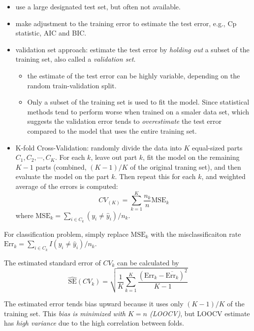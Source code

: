 \documentclass[
  letterpaper,
  DIV=11,
  numbers=noendperiod]{scrreprt}
\providecommand{\tightlist}{%
  \setlength{\itemsep}{0pt}\setlength{\parskip}{0pt}}\usepackage{longtable,booktabs,array}
\begin{document}
\begin{itemize}
\tightlist
\item
  use a large designated test set, but often not available.
\item
  make adjustment to the training error to estimate the test error,
  e.g., Cp statistic, AIC and BIC.
\item
  validation set approach: estimate the test error by \emph{holding out}
  a subset of the training set, also called a \emph{validation set}.

  \begin{itemize}
  \tightlist
  \item
    the estimate of the test error can be highly variable, depending on
    the random train-validation split.
  \item
    Only a subset of the training set is used to fit the model. Since
    statistical methods tend to perform worse when trained on a smaler
    data set, which suggests the validation error tends to
    \emph{overestimate} the test error compared to the model that uses
    the entire training set.
  \end{itemize}
\item
  K-fold Cross-Validation: randomly divide the data into \(K\)
  equal-sized parts \(C_1, C_2, \cdots, C_K\). For each \(k\), leave out
  part \(k\), fit the model on the remaining \(K-1\) parts (combined,
  \((K-1)/K\) of the original traning set), and then evaluate the model
  on the part \(k\). Then repeat this for each \(k\), and weighted
  average of the errors is computed: \[
  CV_{(K)} = \sum_{k=1}^K \frac{n_k}{n}\text{MSE}_k
  \] where \(\text{MSE}_k=\sum_{i\in C_k}(y_i\ne \hat{y}_i)/n_k\).
\end{itemize}

For classification problem, simply replace \(\text{MSE}_k\) with the
misclassificaiton rate
\(\text{Err}_k =\sum_{i\in C_k}I(y_i\ne \hat{y}_i)/n_k\).

The estimated standard error of \(CV_k\) can be calculated by \[
\hat{\text{SE}}(CV_k)=\sqrt{\frac{1}{K}\sum_{k=1}^K\frac{(\text{Err}_k-\overline{\text{Err}_k})^2}{K-1}}
\]

The estimated error tends bias upward because it uses only \((K-1)/K\)
of the training set. This \emph{bias is minimized with \(K=n\) (LOOCV)},
but LOOCV estimate has \emph{high variance} due to the high correlation
between folds.
\end{document}
